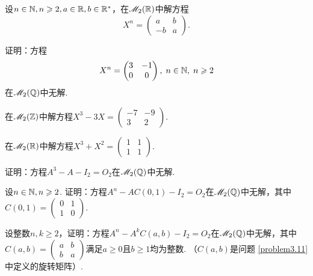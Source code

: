 \begin{problem}
  设$n\in\mathbb N,n\geqslant2,a\in\mathbb R,b\in\mathbb R^\ast$，在$\mathscr M_2(\mathbb R)$中解方程
  \[
    X^n = \begin{pmatrix}
      a & b \\
      -b & a
    \end{pmatrix}.
  \]
\end{problem}

\begin{problem}
  证明：方程
  \[
    X^n = \begin{pmatrix}
      3 & - 1\\
      0 & 0
    \end{pmatrix},\;n\in\mathbb N,\;n\geqslant2
  \]
  在$\mathscr M_2(\mathbb Q)$中无解.
\end{problem}

\begin{problem}
  在$\mathscr M_2(\mathbb Z)$中解方程$X^3-3X=\begin{pmatrix}
    -7 & -9 \\
    3 & 2
  \end{pmatrix}$.
\end{problem}

\begin{problem}
  在$\mathscr M_2(\mathbb R)$中解方程$X^3+X^2=\begin{pmatrix}
    1 & 1 \\
    1 & 1
  \end{pmatrix}$.
\end{problem}

\begin{mybox}
  \begin{problem}[两个特殊的无解方程.]
    \begin{enum}
      \item 证明：方程$A^3-A-I_2=O_2$在$\mathscr M_2(\mathbb Q)$中无解.
      \item 设$n\in\mathbb N,n\geqslant2$. 证明：方程$A^n-AC(0,1)-I_2=O_2$在$\mathscr M_2(\mathbb Q)$中无解，其中$C(0,1)=\begin{pmatrix}
            0 & 1 \\
            1 & 0
          \end{pmatrix}$.
    \end{enum}
  \end{problem}
\end{mybox}

\begin{mybox}
  \begin{problem}[二项式矩阵理论的瑰宝.]

   设整数$n,k\ge2$，证明：方程$A^n-A^kC(a,b)-I_2=O_2$在$\mathscr M_2(\mathbb Q)$中无解，其中$C(a,b)=\begin{pmatrix}
     a & b \\
     b & a
   \end{pmatrix}$满足$a\ge0$且$b\ge1$均为整数. （$C(a,b)$是问题 \ref{problem3.11} 中定义的旋转矩阵）.
  \end{problem}
\end{mybox}

